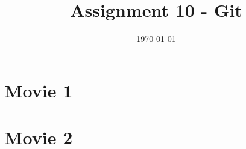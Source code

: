 \documentclass[]{article}
\title{Assignment 10 - Git}
\date{\today}
\begin{document}
\maketitle
\section{Movie 1}
\section{Movie 2}
\end{document}
